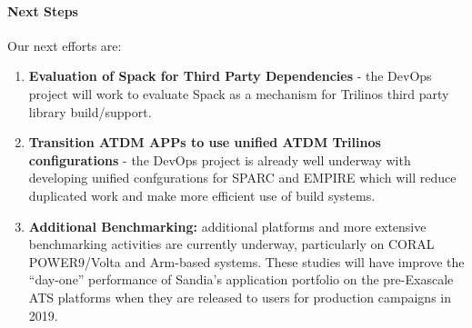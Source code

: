 \paragraph{Next Steps}

Our next efforts are:

\begin{enumerate}

\item {\bf Evaluation of Spack for Third Party Dependencies} - the DevOps project will work to evaluate Spack as a mechanism for Trilinos third party library build/support.

\item \textbf{Transition ATDM APPs to use unified ATDM Trilinos configurations} - the DevOps project is already well underway with developing unified confgurations for SPARC and EMPIRE which will reduce duplicated work and make more efficient use of build systems.

\item \textbf{Additional Benchmarking:} additional platforms and more extensive benchmarking activities are currently underway, particularly on CORAL POWER9/Volta and Arm-based systems. These studies will have improve the ``day-one'' performance of Sandia's application portfolio on the pre-Exascale ATS platforms when they are released to users for production campaigns in 2019.

\end{enumerate}
